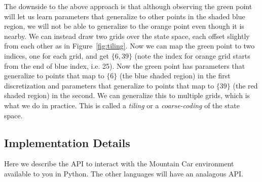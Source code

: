 \documentclass[11pt,addpoints,answers]{exam}
\begin{document}
The downside to the above approach is that although observing the green point will let us learn parameters that generalize to other points in the shaded blue region, we will not be able to generalize to the orange point even though it is nearby. We can instead draw two grids over the state space, each offset slightly from each other as in Figure~\ref{fig:tiling}. Now we can map the green point to two indices, one for each grid, and get $\{6, 39\}$ (note the index for orange grid starts from the end of blue index, i.e. 25). Now the green point has parameters that generalize to points that map to $\{6\}$ (the blue shaded region) in the first discretization and parameters that generalize to points that map to $\{39\}$ (the red shaded region) in the second. We can generalize this to multiple grids, which is what we do in practice. This is called a \emph{tiling} or a \emph{coarse-coding} of the state space. 


\subsection{Implementation Details}
Here we describe the API to interact with the Mountain Car environment available to you in Python. The other languages will have an analagous API. 
\end{document}
